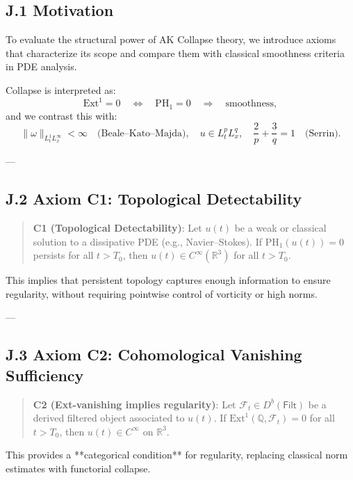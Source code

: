 \subsection*{J.1 Motivation}

To evaluate the structural power of AK Collapse theory, we introduce  
axioms that characterize its scope and compare them with classical smoothness criteria in PDE analysis.

Collapse is interpreted as:
\[
\mathrm{Ext}^1 = 0 \quad \Leftrightarrow \quad \mathrm{PH}_1 = 0 \quad \Rightarrow \quad \text{smoothness},
\]
and we contrast this with:
\[
\|\omega\|_{L^1_t L^\infty_x} < \infty \quad \text{(Beale–Kato–Majda)}, \quad
u \in L^p_t L^q_x, \quad \frac{2}{p} + \frac{3}{q} = 1 \quad \text{(Serrin)}.
\]

---

\subsection*{J.2 Axiom C1: Topological Detectability}

\begin{quote}
\textbf{C1 (Topological Detectability)}:  
Let \( u(t) \) be a weak or classical solution to a dissipative PDE (e.g., Navier–Stokes).  
If \( \mathrm{PH}_1(u(t)) = 0 \) persists for all \( t > T_0 \), then \( u(t) \in C^\infty(\mathbb{R}^3) \) for all \( t > T_0 \).
\end{quote}

This implies that persistent topology captures enough information to ensure regularity,  
without requiring pointwise control of vorticity or high norms.

---

\subsection*{J.3 Axiom C2: Cohomological Vanishing Sufficiency}

\begin{quote}
\textbf{C2 (Ext-vanishing implies regularity)}:  
Let \( \mathcal{F}_t \in D^b(\mathsf{Filt}) \) be a derived filtered object associated to \( u(t) \).  
If \( \mathrm{Ext}^1(\mathbb{Q}, \mathcal{F}_t) = 0 \) for all \( t > T_0 \),  
then \( u(t) \in C^\infty \) on \( \mathbb{R}^3 \).
\end{quote}

This provides a **categorical condition** for regularity, replacing classical norm estimates with functorial collapse.

